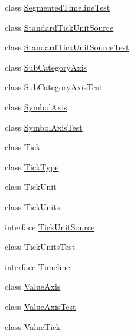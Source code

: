 \begin{DoxyCompactItemize}
\item 
class \mbox{\hyperlink{classorg_1_1jfree_1_1chart_1_1axis_1_1_segmented_timeline_test}{Segmented\+Timeline\+Test}}
\item 
class \mbox{\hyperlink{classorg_1_1jfree_1_1chart_1_1axis_1_1_standard_tick_unit_source}{Standard\+Tick\+Unit\+Source}}
\item 
class \mbox{\hyperlink{classorg_1_1jfree_1_1chart_1_1axis_1_1_standard_tick_unit_source_test}{Standard\+Tick\+Unit\+Source\+Test}}
\item 
class \mbox{\hyperlink{classorg_1_1jfree_1_1chart_1_1axis_1_1_sub_category_axis}{Sub\+Category\+Axis}}
\item 
class \mbox{\hyperlink{classorg_1_1jfree_1_1chart_1_1axis_1_1_sub_category_axis_test}{Sub\+Category\+Axis\+Test}}
\item 
class \mbox{\hyperlink{classorg_1_1jfree_1_1chart_1_1axis_1_1_symbol_axis}{Symbol\+Axis}}
\item 
class \mbox{\hyperlink{classorg_1_1jfree_1_1chart_1_1axis_1_1_symbol_axis_test}{Symbol\+Axis\+Test}}
\item 
class \mbox{\hyperlink{classorg_1_1jfree_1_1chart_1_1axis_1_1_tick}{Tick}}
\item 
class \mbox{\hyperlink{classorg_1_1jfree_1_1chart_1_1axis_1_1_tick_type}{Tick\+Type}}
\item 
class \mbox{\hyperlink{classorg_1_1jfree_1_1chart_1_1axis_1_1_tick_unit}{Tick\+Unit}}
\item 
class \mbox{\hyperlink{classorg_1_1jfree_1_1chart_1_1axis_1_1_tick_units}{Tick\+Units}}
\item 
interface \mbox{\hyperlink{interfaceorg_1_1jfree_1_1chart_1_1axis_1_1_tick_unit_source}{Tick\+Unit\+Source}}
\item 
class \mbox{\hyperlink{classorg_1_1jfree_1_1chart_1_1axis_1_1_tick_units_test}{Tick\+Units\+Test}}
\item 
interface \mbox{\hyperlink{interfaceorg_1_1jfree_1_1chart_1_1axis_1_1_timeline}{Timeline}}
\item 
class \mbox{\hyperlink{classorg_1_1jfree_1_1chart_1_1axis_1_1_value_axis}{Value\+Axis}}
\item 
class \mbox{\hyperlink{classorg_1_1jfree_1_1chart_1_1axis_1_1_value_axis_test}{Value\+Axis\+Test}}
\item 
class \mbox{\hyperlink{classorg_1_1jfree_1_1chart_1_1axis_1_1_value_tick}{Value\+Tick}}
\end{DoxyCompactItemize}
